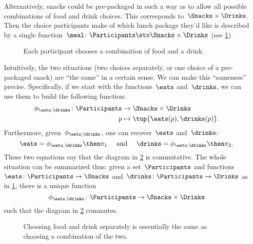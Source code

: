 Alternatively, snacks could be pre-packaged in such a way as to allow all possible combinations of food and drink choices. This corresponds to~$\Snacks\times \Drinks$.
Then the choice participants make of which lunch package they'd like is described by a single function~$\meal \colon \Participants\sto \Snacks\times \Drinks$ (see \cref{fig:snacks_2}).

\begin{figure}[h!]
  \begin{center}
  \end{center}
  \caption{Each participant chooses a combination of food and a drink. \label{fig:snacks_2}}
\end{figure}


Intuitively, the two situations (two choices separately, or one choice of a pre-packaged snack) are ``the same'' in a certain sense.
We can make this ``sameness'' precise.
Specifically, if we start with the functions~$\eats$ and~$\drinks$, we can use them to build the following function:
\begin{equation}\label{eq:snacks-building-univ-map}
  \begin{aligned}
    \phi_{\eats,\drinks}\colon \Participants&\to \Snacks\times \Drinks\\
    p&\mapsto \tup{\eats(p),\drinks(p)}.
  \end{aligned}
\end{equation}
Furthermore, given~$\phi_{\eats,\drinks}$, one can recover~$\eats$ and~$\drinks$:
\begin{equation}\label{eq:snacks-proj-univ-map}
  \eats =\phi_{\eats,\drinks}\then \pi_1 \quad  \text{ and } \quad \drinks=\phi_{\eats,\drinks}\then \pi_2.
\end{equation}
These two equations say that the diagram in \cref{fig:snacks_3} is commutative.
The whole situation can be summarized thus: given a set~$\Participants$ and functions~$\eats\colon \Participants \to \Snacks$ and~$\drinks\colon \Participants \to \Drinks$ as in \cref{fig:snacks_2}, there is a unique function~
\begin{equation}\label{eq:snacks-unique-univ-map}
\phi_{\eats,\drinks} \colon \Participants \to \Snacks \times \Drinks
\end{equation}
such that the diagram in \cref{fig:snacks_3} commutes.

\begin{figure}[h!]
  \begin{center}
  \end{center}
  \caption{Choosing food and drink separately is essentially the same as choosing a combination of the two. }
  \label{fig:snacks_3}
\end{figure}

